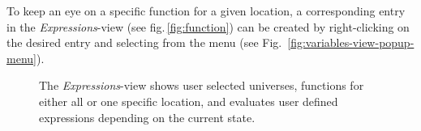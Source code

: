 \documentclass[10pt,oneside,a4paper]{article}
\begin{document}
To keep an eye on a specific function for a given location, a corresponding entry in the \emph{Expressions}-view (see fig.\,\ref{fig:function}) can be created by right-clicking on the desired entry and selecting  from the menu (see Fig.~\ref{fig:variables-view-popup-menu}).
\begin{figure}[h]
\centering
	\quad

	\caption{The \emph{Expressions}-view shows user selected universes, functions for either all or one specific location, and evaluates user defined expressions depending on the current state.}
	\label{fig:expressions-view}
\end{figure}
\end{document}
